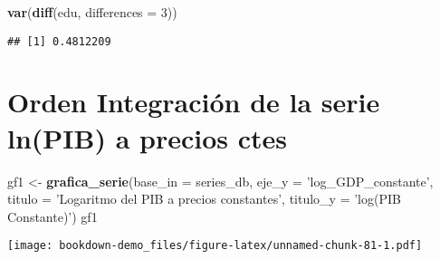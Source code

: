 \documentclass[]{book}
\newenvironment{Shaded}{\begin{snugshade}}{\end{snugshade}}
\newcommand{\KeywordTok}[1]{\textcolor[rgb]{0.13,0.29,0.53}{\textbf{#1}}}
\newcommand{\DataTypeTok}[1]{\textcolor[rgb]{0.13,0.29,0.53}{#1}}
\newcommand{\DecValTok}[1]{\textcolor[rgb]{0.00,0.00,0.81}{#1}}
\newcommand{\StringTok}[1]{\textcolor[rgb]{0.31,0.60,0.02}{#1}}
\newcommand{\OperatorTok}[1]{\textcolor[rgb]{0.81,0.36,0.00}{\textbf{#1}}}
\newcommand{\NormalTok}[1]{#1}
\theoremstyle{definition}
\theoremstyle{definition}
\theoremstyle{definition}
\theoremstyle{remark}
\begin{document}
\begin{Shaded}
\begin{Highlighting}[]
\KeywordTok{var}\NormalTok{(}\KeywordTok{diff}\NormalTok{(edu, }\DataTypeTok{differences =} \DecValTok{3}\NormalTok{))}
\end{Highlighting}
\end{Shaded}

\begin{verbatim}
## [1] 0.4812209
\end{verbatim}

\chapter{Orden Integración de la serie ln(PIB) a precios
ctes}\label{orden-integracion-de-la-serie-lnpib-a-precios-ctes}

\begin{Shaded}
\begin{Highlighting}[]
\NormalTok{gf1 <-}\StringTok{ }\KeywordTok{grafica_serie}\NormalTok{(}\DataTypeTok{base_in =}\NormalTok{ series_db, }
                      \DataTypeTok{eje_y =} \StringTok{'log_GDP_constante'}\NormalTok{, }
                      \DataTypeTok{titulo =} \StringTok{'Logaritmo del PIB a precios constantes'}\NormalTok{, }
                      \DataTypeTok{titulo_y =} \StringTok{'log(PIB Constante)'}\NormalTok{)}
\NormalTok{gf1}
\end{Highlighting}
\end{Shaded}

\texttt{[image: bookdown-demo\_files/figure-latex/unnamed-chunk-81-1.pdf]}

\begin{Shaded}
\end{Shaded}
\end{document}
